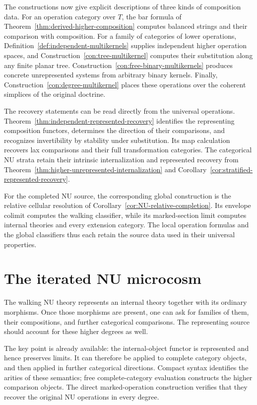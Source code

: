 \documentclass[oneside]{article}
\theoremstyle{plain}
\theoremstyle{definition}
\theoremstyle{remark}
\begin{document}
The constructions now give explicit descriptions of three kinds of
composition data. For an operation category over $T$, the bar formula
of Theorem~\ref{thm:derived-higher-composition} computes balanced
strings and their comparison with composition. For a family of
categories of lower operations, Definition~\ref{def:independent-multikernels}
supplies independent higher operation spaces, and
Construction~\ref{con:tree-multikernel} computes their substitution
along any finite planar tree. Construction~\ref{con:free-binary-multikernels}
produces concrete unrepresented systems from arbitrary binary kernels.
Finally, Construction~\ref{con:degree-multikernel} places these operations
over the coherent simplices of the original doctrine.

The recovery statements can be read directly from the universal
operations. Theorem~\ref{thm:independent-represented-recovery} identifies
the representing composition functors, determines the direction of
their comparisons, and recognizes invertibility by stability under
substitution. Its map calculation recovers lax comparisons and their
full transformation categories. The categorical NU strata retain
their intrinsic internalization and represented recovery from
Theorem~\ref{thm:higher-unrepresented-internalization} and
Corollary~\ref{cor:stratified-represented-recovery}.

For the completed NU source, the corresponding global construction is
the relative cellular resolution of
Corollary~\ref{cor:NU-relative-completion}. Its envelope colimit
computes the walking classifier, while its marked-section limit
computes internal theories and every extension category. The local
operation formulas and the global classifiers thus each retain the
source data used in their universal properties.

\section{The iterated NU microcosm}
\label{sec:stratified-microcosm}

The walking NU theory represents an internal theory together with its
ordinary morphisms. Once those morphisms are present, one can ask for
families of them, their compositions, and further categorical comparisons.
The representing source should account for these higher degrees as well.

The key point is already available: the internal-object functor is
represented and hence preserves limits. It can therefore be applied to
complete category objects, and then applied in further categorical
directions. Compact syntax identifies the arities of these semantics;
free complete-category evaluation constructs the higher comparison
objects. The direct marked-operation construction verifies that they
recover the original NU operations in every degree.
\end{document}
